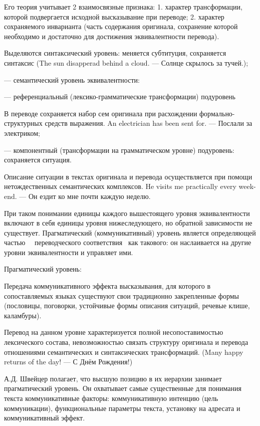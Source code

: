 Его теория учитывает 2 взаимосвязные признака: 1. характер трансформации, которой подвергается исходной высказывание при переводе; 2. характер сохраняемого инварианта (часть содержания оригинала, сохранение которой необходимо и достаточно для достижения эквивалентности перевода).

Выделяются синтаксический уровень: меняется субтитуция, сохраняется синтаксис (The sun disapperad behind a cloud. --- Солнце скрылось за тучей.);

--- семантический уровень эквивалентности: 

--- референциальный (лексико-грамматические трансформации) подуровень

В переводе сохраняется набор сем оригинала при расхождении формально-структурных средств выражения. An electrician has been sent for. --- Послали за электриком; 

--- компонентный (трансформации на грамматическом уровне) подуровень: сохраняется ситуация.

Описание ситуации в текстах оригинала и перевода осуществляется при помощи нетождественных семантических комплексов. He visits me practically every week-end. --- Он ездит ко мне почти каждую неделю.

При таком понимании единицы каждого вышестоящего уровня эквивалентности включают в себя единицы уровня нижеследующего, но обратной зависимости не существует. Прагматический (коммуникативный) уровень является определяющей частью   переводческого соответствия  как такового: он наслаивается на другие уровни эквивалентности и управляет ими.

Прагматический уровень:

Передача коммуникативного эффекта высказывания, для которого в сопоставляемых языках существуют свои традиционно закрепленные формы (пословицы, поговорки, устойчивые формы описания ситуаций, речевые клише, каламбуры).

Перевод на данном уровне характеризуется полной несопоставимостью лексического состава, невозможностью связать структуру оригинала и перевода отношениями семантических и синтаксических трансформаций. (Many happy returns of the day! --- С Днём Рождения!)

А.Д. Швейцер полагает, что высшую позицию в их иерархии занимает прагматический уровень. Он охватывает самые существенные для понимания текста коммуникативные факторы: коммуникативную интенцию (цель коммуникации), функциональные параметры текста, установку на адресата и коммуникативный эффект. 